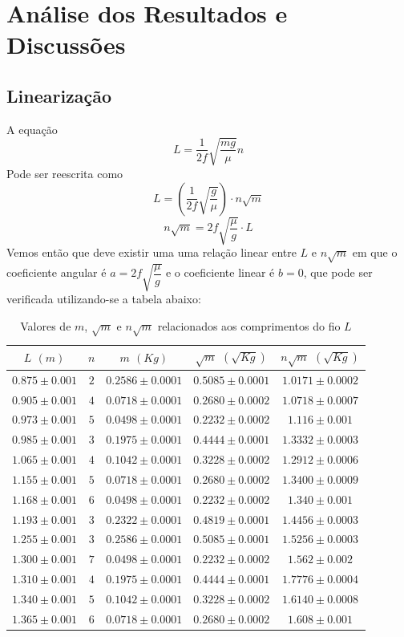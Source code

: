 \documentclass[12pt,a4paper]{article}
\begin{document}
\section{Análise dos Resultados e Discussões}
\subsection{Linearização}
A equação
$$ L = \dfrac{1}{2f} \sqrt{\dfrac{mg}{\mu}} n $$
Pode ser reescrita como
$$ L = (\dfrac{1}{2f} \sqrt{\dfrac{g}{\mu}}) \cdot n\sqrt{m} $$
$$ n \sqrt{m} = 2f\sqrt{\frac{\mu}{g}} \cdot L $$
Vemos então que deve existir uma uma relação linear entre $L$ e $n\sqrt{m}$ em que o coeficiente angular é $a = 2f \sqrt{\dfrac{\mu}{g}}$ e o coeficiente linear é $b = 0$, que pode ser verificada utilizando-se a tabela abaixo:

\begin{table}[!htbp]
\centering
\def\arraystretch{1.3}
\caption{Valores de $m$, $\sqrt{m}$ e $n\sqrt{m}$ relacionados aos comprimentos do fio $L$}
\label{Resultados}
\begin{tabular}{|c|c|c|c|c|}
\hline
$L$ $(m)$ & $n$ & $m$ $(Kg)$ & $\sqrt{m}$ $(\sqrt{Kg})$ & $n\sqrt{m}$ $(\sqrt{Kg})$ \\
\hline
$0.875\pm0.001$ & $2$ & $0.2586\pm0.0001$ & $0.5085\pm0.0001$ & $1.0171\pm0.0002$ \\
\hline
$0.905\pm0.001$ & $4$ & $0.0718\pm0.0001$ & $0.2680\pm0.0002$ & $1.0718\pm0.0007$ \\
\hline
$0.973\pm0.001$ & $5$ & $0.0498\pm0.0001$ & $0.2232\pm0.0002$ & $1.116\pm0.001$ \\
\hline
$0.985\pm0.001$ & $3$ & $0.1975\pm0.0001$ & $0.4444\pm0.0001$ & $1.3332\pm0.0003$ \\
\hline
$1.065\pm0.001$ & $4$ & $0.1042\pm0.0001$ & $0.3228\pm0.0002$ & $1.2912\pm0.0006$ \\
\hline
$1.155\pm0.001$ & $5$ & $0.0718\pm0.0001$ & $0.2680\pm0.0002$ & $1.3400\pm0.0009$ \\
\hline
$1.168\pm0.001$ & $6$ & $0.0498\pm0.0001$ & $0.2232\pm0.0002$ & $1.340\pm0.001$ \\
\hline
$1.193\pm0.001$ & $3$ & $0.2322\pm0.0001$ & $0.4819\pm0.0001$ & $1.4456\pm0.0003$ \\
\hline
$1.255\pm0.001$ & $3$ & $0.2586\pm0.0001$ & $0.5085\pm0.0001$ & $1.5256\pm0.0003$ \\
\hline
$1.300\pm0.001$ & $7$ & $0.0498\pm0.0001$ & $0.2232\pm0.0002$ & $1.562\pm0.002$ \\
\hline
$1.310\pm0.001$ & $4$ & $0.1975\pm0.0001$ & $0.4444\pm0.0001$ & $1.7776\pm0.0004$ \\
\hline
$1.340\pm0.001$ & $5$ & $0.1042\pm0.0001$ & $0.3228\pm0.0002$ & $1.6140\pm0.0008$ \\
\hline
$1.365\pm0.001$ & $6$ & $0.0718\pm0.0001$ & $0.2680\pm0.0002$ & $1.608\pm0.001$ \\
\hline

\end{tabular} \\

\end{table}
\end{document}

